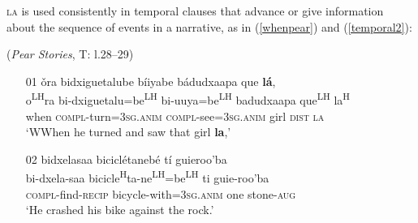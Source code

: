 \textsc{la} is used consistently in temporal clauses that advance or give information about the sequence of events in a narrative, as in (\ref{whenpear}) and (\ref{temporal2}):

\ea\label{whenpear} (\textit{Pear Stories}, T: l.28--29)
\begin{itemize}
\item[01]
\glll \v{o}ra bidxiguetalube b\'{i}iyabe b\'{a}dudxaapa que \textbf{l\'{a}},  \\
o\textsuperscript{LH}ra bi-dxiguetalu=be\textsuperscript{LH} bi-uuya=be\textsuperscript{LH} badudxaapa que\textsuperscript{LH} la\textsuperscript{H}  \\
when \textsc{compl}-turn=3\textsc{sg.anim} \textsc{compl}-see=3\textsc{sg.anim} girl \textsc{dist} \textsc{la}  \\
\glt `WWhen he turned and saw that girl \textbf{la},'


\item[02]
\glll bidxelasaa bicicl\'{e}taneb\'{e} t\'{i} guieroo'ba  \\
bi-dxela-saa bicicle\textsuperscript{H}ta-ne\textsuperscript{LH}=be\textsuperscript{LH} ti guie-roo'ba  \\
\textsc{compl}-find-\textsc{recip} bicycle-with=3\textsc{sg.anim} one stone-\textsc{aug}  \\
\glt `He crashed his bike against the rock.' 

\end{itemize}
\z

